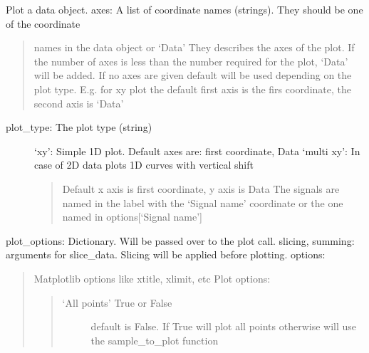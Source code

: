 \documentclass[letterpaper,10pt,english]{sphinxmanual}
\begin{document}
\begin{fulllineitems}

\begin{fulllineitems}
\label{\detokenize{data_object:flap.data_object.DataObject.plot}}
Plot a data object.
axes: A list of coordinate names (strings). They should be one of the coordinate
\begin{quote}

names in the data object or ‘Data’
They describes the axes of the plot.
If the number of axes is less than the number required for the plot, ‘Data’ will be added.
If no axes are given default will be used depending on the plot type. E.g. for
x\sphinxhyphen{}y plot the default first axis is the firs coordinate, the second axis is ‘Data’
\end{quote}
\begin{description}
\item[{plot\_type: The plot type (string)}] \leavevmode
‘xy’: Simple 1D plot. Default axes are: first coordinate, Data
‘multi xy’: In case of 2D data plots 1D curves with vertical shift
\begin{quote}

Default x axis is first coordinate, y axis is Data
The signals are named in the label with the ‘Signal name’ coordinate or the one
named in options{[}‘Signal name’{]}
\end{quote}

\end{description}

plot\_options: Dictionary. Will be passed over to the plot call.
slicing, summing: arguments for slice\_data. Slicing will be applied before plotting.
options:
\begin{quote}

Matplotlib options like xtitle, xlimit, etc
Plot options:
\begin{quote}
\begin{description}
\item[{‘All points’ True or False}] \leavevmode
default is False. If True will plot all points otherwise will use
the sample\_to\_plot function


\end{description}
\end{quote}
\end{quote}
\end{fulllineitems}
\end{fulllineitems}
\end{document}

